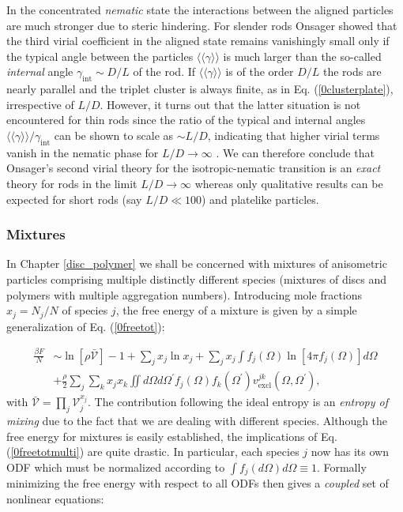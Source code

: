 {In the concentrated {\em nematic} state the interactions between the aligned particles are much stronger due to steric hindering. For slender rods Onsager showed that the third virial coefficient in the aligned state remains vanishingly small  only if the typical angle between the particles $\langle\langle \gamma \rangle\rangle $ is much larger than the so-called {\em internal} angle $\gamma_{\text{int}}\sim D/L$ of the rod. If $\langle\langle \gamma \rangle\rangle$ is of the order $D/L$ the rods are nearly parallel and the triplet cluster is always finite, as in Eq. (\ref{0clusterplate}), irrespective of $L/D$. However, it turns out that the latter situation is not encountered for thin rods since the ratio of the typical and internal angles $\langle\langle \gamma \rangle\rangle /\gamma_{\text{int}}$  can be shown to scale as $\sim L/D$, indicating that higher virial terms vanish in the nematic phase  for $L/D\rightarrow \infty$ \cite{Vroege92}. We can therefore conclude that  Onsager's  second virial theory for the isotropic-nematic transition is an {\em exact} theory for rods in the limit $L/D \rightarrow \infty$ whereas  only qualitative results can be expected for short rods (say $L/D\ll 100$) and  platelike particles.

\subsubsection{Mixtures}

In Chapter \ref{disc_polymer} we shall be concerned with mixtures of anisometric particles comprising multiple distinctly different species (mixtures of discs and polymers with multiple aggregation numbers). Introducing  mole fractions $x_{j}=N_{j}/N$ of species $j$,  the free energy of a mixture is given by a simple generalization of Eq. (\ref{0freetot}):

\begin{align}
\frac{\beta F}{N} &\sim \ln [\rho \mathcal{\bar{V}}]-1 + \sum_{j} x_{j} \ln x_{j} +
\sum_{j} x_{j} \int f_{j}(\Omega)\ln \left[ 4 \pi f_{j}(\Omega) \right] d \Omega \nonumber \\
&+\frac{\rho}{2}\sum_{j}\sum_{k}x_{j}x_{k} \iint  d \Omega d\Omega^{\prime}
f_{j}(\Omega)f_{k}(\Omega^{\prime})
v_{\text{excl}}^{jk}(\Omega,\Omega^{\prime}),  \label{0freetotmulti}
\end{align}
with $\mathcal{\bar{V}}=\prod_{j}\mathcal{V}_{j}^{x_{j}}$. The contribution following the ideal entropy is an {\em entropy of mixing} due to the fact that we are dealing with different species. Although the free energy for mixtures is easily established,  the implications of Eq. (\ref{0freetotmulti}) are quite drastic. In particular, each species $j$ now has its own ODF which must be normalized according to $\int f_{j}(d\Omega)d\Omega \equiv 1$. Formally minimizing the free energy with respect to all ODFs then gives a {\em coupled} set of nonlinear equations:

}
